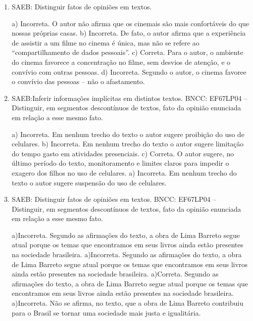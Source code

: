 \begin{enumerate}

\item
SAEB: Distinguir fatos de opiniões em textos.

a) Incorreta. O autor não afirma que os cinemais são mais confortáveis do que nossas próprias casas.
b) Incorreta. De fato, o autor afirma que a experiência de assistir a um filme no cinema é única,
mas não se refere ao ``compartilhamento de dados pessoais''. 
c) Correta. Para o autor, o ambiente do cinema favorece a concentração no filme, sem desvios de atenção,
e o convívio com outras pessoas.
d) Incorreta. Segundo o autor, o cinema favoree o convívio das pessoas -- não o afastamento. 

\item
SAEB:Inferir informações implícitas em distintos textos.
BNCC: EF67LP04 -- Distinguir, em segmentos descontínuos de
textos, fato da opinião enunciada em relação a esse mesmo fato.

a) Incorreta. Em nenhum trecho do texto o autor sugere proibição do uso de celulares.
b) Incorreta. Em nenhum trecho do texto o autor sugere limitação do tempo gasto em atividades presenciais.
c) Correta. O autor sugere, no último período do texto, monitoramento e
limites claros para impedir o exagero dos filhos no uso de celulares.
a) Incorreta. Em nenhum trecho do texto o autor sugere suspensão do uso de celulares.

\item
SAEB: Distinguir fatos de opiniões em textos.
BNCC: EF67LP04 -- Distinguir, em segmentos descontínuos de textos,
fato da opinião enunciada em relação a esse mesmo fato.

a)Incorreta. Segundo as afirmações do texto, a obra de Lima Barreto segue atual porque os temas
que encontramos em seus livros ainda estão presentes na sociedade brasileira.     
a)Incorreta. Segundo as afirmações do texto, a obra de Lima Barreto segue atual porque os temas
que encontramos em seus livros ainda estão presentes na sociedade brasileira. 
a)Correta. Segundo as afirmações do texto, a obra de Lima Barreto segue atual porque os temas
que encontramos em seus livros ainda estão presentes na sociedade brasileira. 
a)Incorreta. Não se afirma, no texto, que a obra de Lima Barreto contribuiu para o Brasil se tornar uma sociedade mais justa e igualitária.

\end{enumerate}


